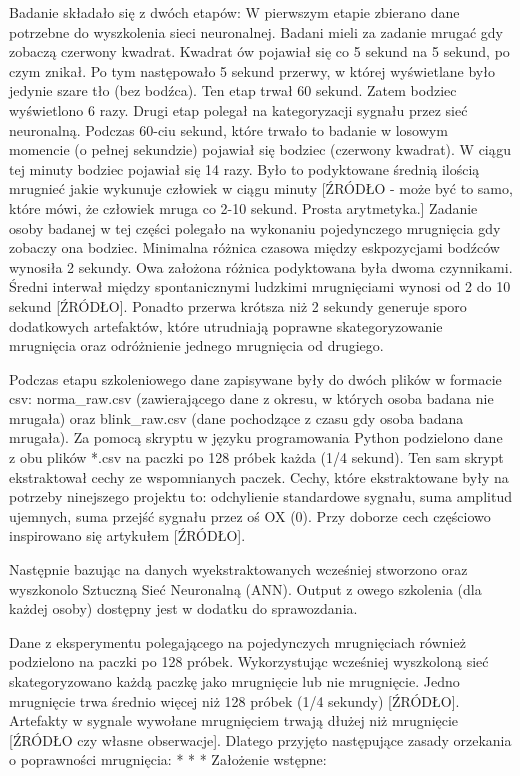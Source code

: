 \documentclass{article}
\begin{document}
    Badanie składało się z dwóch etapów: 
    W pierwszym etapie zbierano dane potrzebne do wyszkolenia sieci neuronalnej. Badani mieli za zadanie mrugać gdy zobaczą czerwony kwadrat. Kwadrat ów pojawiał się co 5 sekund na 5 sekund, po czym znikał. Po tym następowało 5 sekund przerwy, w której wyświetlane było jedynie szare tło (bez bodźca). Ten etap trwał 60 sekund. Zatem bodziec wyświetlono 6 razy.
    Drugi etap polegał na kategoryzacji sygnału przez sieć neuronalną. Podczas 60-ciu sekund, które trwało to badanie w losowym momencie (o pełnej sekundzie) pojawiał się bodziec (czerwony kwadrat). W ciągu tej minuty bodziec pojawiał się 14 razy. Było to podyktowane średnią ilością mrugnieć jakie wykunuje człowiek w ciągu minuty [ŹRÓDŁO - może być to samo, które mówi, że człowiek mruga co 2-10 sekund. Prosta arytmetyka.]
    Zadanie osoby badanej w tej części polegało na wykonaniu pojedynczego mrugnięcia gdy zobaczy ona bodziec.
    Minimalna różnica czasowa między eskpozycjami bodźców wynosiła 2 sekundy. Owa założona różnica podyktowana była dwoma czynnikami. Średni interwał między spontanicznymi ludzkimi mrugnięciami wynosi od 2 do 10 sekund [ŹRÓDŁO]. Ponadto przerwa krótsza niż 2 sekundy generuje sporo dodatkowych artefaktów, które utrudniają poprawne skategoryzowanie mrugnięcia oraz odróżnienie jednego mrugnięcia od drugiego. 

    Podczas etapu szkoleniowego dane zapisywane były do dwóch plików w formacie csv: norma\_raw.csv (zawierającego dane z okresu, w których osoba badana nie mrugała) oraz blink\_raw.csv (dane pochodzące z czasu gdy osoba badana mrugała). Za pomocą skryptu w języku programowania Python podzielono dane z obu plików *.csv na paczki po 128 próbek każda (1/4 sekund). Ten sam skrypt ekstraktował cechy ze wspomnianych paczek. Cechy, które ekstraktowane były na potrzeby ninejszego projektu to: odchylienie standardowe sygnału, suma amplitud ujemnych, suma przejść sygnału przez oś OX (0). Przy doborze cech częściowo inspirowano się artykułem [ŹRÓDŁO].

    Następnie bazując na danych wyekstraktowanych wcześniej stworzono oraz wyszkonolo Sztuczną Sieć Neuronalną (ANN). Output z owego szkolenia (dla każdej osoby) dostępny jest w dodatku do sprawozdania. 

    Dane z eksperymentu polegającego na pojedynczych mrugnięciach również podzielono na paczki po 128 próbek. Wykorzystując wcześniej wyszkoloną sieć skategoryzowano każdą paczkę jako mrugnięcie lub nie mrugnięcie. Jedno mrugnięcie trwa średnio więcej niż 128 próbek (1/4 sekundy) [ŹRÓDŁO]. Artefakty w sygnale wywołane mrugnięciem trwają dłużej niż mrugnięcie [ŹRÓDŁO czy własne obserwacje]. Dlatego przyjęto następujące zasady orzekania o poprawności mrugnięcia:
    \newline
    * * *
    \newline
    Założenie wstępne: 
    
\end{document}
